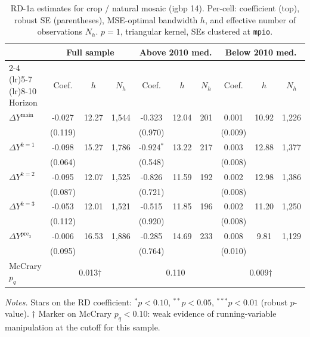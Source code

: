 \documentclass[11pt]{article}
\begin{document}
\begin{table}[H]
\centering
\scriptsize
\caption{RD-1a estimates for crop / natural mosaic (igbp 14). Per-cell: coefficient
(top), robust SE (parentheses), MSE-optimal bandwidth $h$, and
effective number of observations $N_h$. $p=1$, triangular kernel,
SEs clustered at \texttt{mpio}.}
\label{tab:rdplot_rd1a_crop_nature}
\begin{tabular}{l ccc ccc ccc}
\toprule
 & \multicolumn{3}{c}{Full sample} & \multicolumn{3}{c}{Above 2010 med.} & \multicolumn{3}{c}{Below 2010 med.} \\
\cmidrule(lr){2-4} \cmidrule(lr){5-7} \cmidrule(lr){8-10}
Horizon & Coef. & $h$ & $N_h$ & Coef. & $h$ & $N_h$ & Coef. & $h$ & $N_h$ \\
\midrule
$\Delta Y^{\text{main}}$ & -0.027 & 12.27 & 1,544 & -0.323 & 12.04 & 201 & 0.001 & 10.92 & 1,226 \\
 & (0.119) &  &  & (0.970) &  &  & (0.009) &  &  \\
\addlinespace[1pt]
$\Delta Y^{k=1}$ & -0.098 & 15.27 & 1,786 & -0.924$^{*}$ & 13.22 & 217 & 0.003 & 12.88 & 1,377 \\
 & (0.064) &  &  & (0.548) &  &  & (0.008) &  &  \\
\addlinespace[1pt]
$\Delta Y^{k=2}$ & -0.095 & 12.07 & 1,525 & -0.826 & 11.59 & 192 & 0.002 & 12.98 & 1,386 \\
 & (0.087) &  &  & (0.721) &  &  & (0.008) &  &  \\
\addlinespace[1pt]
$\Delta Y^{k=3}$ & -0.053 & 12.01 & 1,521 & -0.515 & 11.85 & 196 & 0.002 & 11.20 & 1,250 \\
 & (0.112) &  &  & (0.920) &  &  & (0.008) &  &  \\
\addlinespace[1pt]
$\Delta Y^{\text{pre}_3}$ & -0.006 & 16.53 & 1,886 & -0.285 & 14.69 & 233 & 0.008 & 9.81 & 1,129 \\
 & (0.095) &  &  & (0.764) &  &  & (0.010) &  &  \\
\addlinespace[1pt]
\midrule
McCrary $p_q$ & \multicolumn{3}{c}{0.013$\dagger$} & \multicolumn{3}{c}{0.110} & \multicolumn{3}{c}{0.009$\dagger$} \\
\bottomrule
\end{tabular}
\begin{flushleft}\footnotesize
\textit{Notes.} Stars on the RD coefficient: $^{*}p<0.10$,
$^{**}p<0.05$, $^{***}p<0.01$ (robust $p$-value).
$\dagger$ Marker on McCrary $p_q<0.10$: weak evidence of running-variable manipulation at the cutoff for this sample.\\
\end{flushleft}
\end{table}
\end{document}
